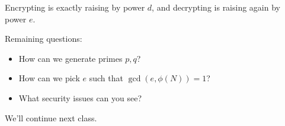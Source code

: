 Encrypting is exactly raising by power $d$, and decrypting is raising again by power $e$.

Remaining questions:
\begin{itemize}
    \item How can we generate primes $p, q$?
    \item How can we pick $e$ such that $\gcd(e, \phi(N)) = 1$?
    \item What security issues can you see?
\end{itemize}

We'll continue next class.